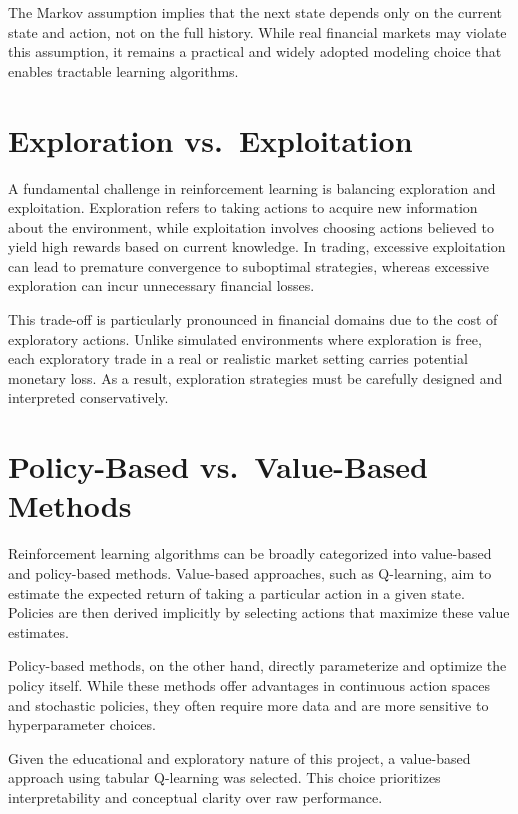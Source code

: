 \documentclass[12pt]{report}
\begin{document}
The Markov assumption implies that the next state depends only on the current state and action, not on the full history. While real financial markets may violate this assumption, it remains a practical and widely adopted modeling choice that enables tractable learning algorithms.

\section{Exploration vs.\ Exploitation}

A fundamental challenge in reinforcement learning is balancing exploration and exploitation. Exploration refers to taking actions to acquire new information about the environment, while exploitation involves choosing actions believed to yield high rewards based on current knowledge. In trading, excessive exploitation can lead to premature convergence to suboptimal strategies, whereas excessive exploration can incur unnecessary financial losses.

This trade-off is particularly pronounced in financial domains due to the cost of exploratory actions. Unlike simulated environments where exploration is free, each exploratory trade in a real or realistic market setting carries potential monetary loss. As a result, exploration strategies must be carefully designed and interpreted conservatively.

\section{Policy-Based vs.\ Value-Based Methods}

Reinforcement learning algorithms can be broadly categorized into value-based and policy-based methods. Value-based approaches, such as Q-learning, aim to estimate the expected return of taking a particular action in a given state. Policies are then derived implicitly by selecting actions that maximize these value estimates.

Policy-based methods, on the other hand, directly parameterize and optimize the policy itself. While these methods offer advantages in continuous action spaces and stochastic policies, they often require more data and are more sensitive to hyperparameter choices.

Given the educational and exploratory nature of this project, a value-based approach using tabular Q-learning was selected. This choice prioritizes interpretability and conceptual clarity over raw performance.
\end{document}
